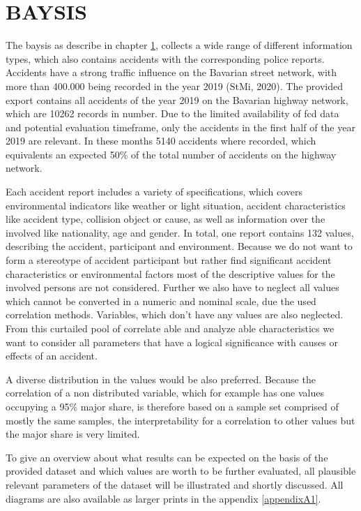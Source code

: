 \documentclass[a4paper,12pt]{report}
\begin{document}
\section{BAYSIS}
\label{dataset_baysis}
\par The \acrfull{baysis} as describe in chapter \ref{dataset_baysis}, collects a wide range of different information types, which also contains accidents with the corresponding police reports. Accidents have a strong traffic influence on the Bavarian street network, with more than 400.000 being recorded in the year 2019 (StMi, 2020). The provided export contains all accidents of the year 2019 on the Bavarian highway network, which are 10262 records in number. Due to the limited availability of \acrshort{fcd} data and potential evaluation timeframe, only the accidents in the first half of the year 2019 are relevant. In these months 5140 accidents where recorded, which equivalents an expected 50\% of the total number of accidents on the highway network. 
\par Each accident report includes a variety of specifications, which covers environmental indicators like weather or light situation, accident characteristics like accident type, collision object or cause, as well as information over the involved like nationality, age and gender. In total, one report contains 132 values, describing the accident, participant and environment. Because we do not want to form a stereotype of accident participant but rather find significant accident characteristics or environmental factors most of the descriptive values for the involved persons are not considered. Further we also have to neglect all values which cannot be converted in a numeric and nominal scale, due the used correlation methods. Variables, which don’t have any values are also neglected. From this curtailed pool of correlate able and analyze able characteristics we want to consider all parameters that have a logical significance with causes or effects of an accident. 
\par A diverse distribution in the values would be also preferred. Because the correlation of a non distributed variable, which for example has one values occupying a 95\% major share, is therefore based on a sample set comprised of mostly the same samples, the interpretability for a correlation to other values but the major share is very limited.
\newline
\par To give an overview about what results can be expected on the basis of the provided dataset and which values are worth to be further evaluated, all plausible relevant parameters of the dataset will be illustrated and shortly discussed. All diagrams are also available as larger prints in the appendix \ref{appendixA1}. 
\end{document}
